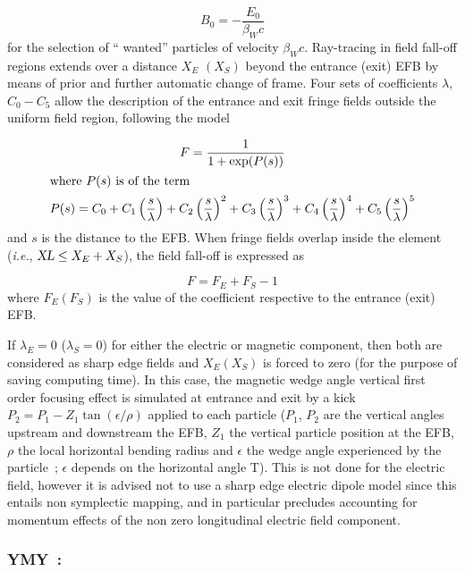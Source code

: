  $$ B_0= - \dfrac{E_0 }{ \beta_ Wc} $$
%
 for the selection of `` wanted''  particles of velocity $\beta_Wc $. Ray-tracing in 
field fall-off regions extends over a distance $ X_E $ $ (X_S) $ beyond the
entrance (exit) EFB by means of prior and further automatic change of frame. Four sets
of coefficients $\lambda$, $ C_0-C_5 $ allow the description of the entrance and exit fringe 
fields outside the uniform field region, following the model~\cite{Biblio12} %

\begin{gather*}
	F = \dfrac{1 }{ 1+ \exp(P(s))} \\
	\intertext{where $  P(s) $ is of the term}
	    P(s) = C_0
	       +C_1 \left(  \dfrac{s }{ \lambda} \right) 
	       +C_2 \left( \dfrac{s }{ \lambda} \right)^2 
	       + C_3 \left( \dfrac{s }{ \lambda} \right)^3 
	       +C_4 \left( \dfrac{s }{ \lambda} \right)^4 
	       + C_5 \left(\dfrac{s }{ \lambda} \right)^5 
\end{gather*}
%
and $ s $ is the distance to the EFB.  When fringe fields overlap
inside the element (\emph{i.e.}, $ \textsl{XL}\leq X_E+X_S$),  the field fall-off is expressed as

$$ F = F_E + F_S -1 $$
%
 where $ F_E(F_S) $ is the value of the coefficient respective to the entrance (exit) EFB. 
 
\noindent If $ \lambda_ E=0 $  ($\lambda_ S=0$)  for either the electric or
magnetic component, then both are considered as sharp edge fields and $ X_E(X_S) $ is forced 
to zero (for the purpose of saving computing time).  In this case, the magnetic wedge angle vertical first order focusing effect is simulated at entrance and exit by a kick $P_2 = P_1 - Z_1 \tan (\epsilon / \rho)$ applied to each particle ($P_1$, $P_2$ are the vertical angles upstream and downstream the EFB, $Z_1$ the vertical particle position at the EFB, $\rho$ the local horizontal bending radius and $\epsilon$ the wedge angle experienced by the particle~; $\epsilon$ depends on the horizontal angle T). This is not done for the electric field, however it is advised not to use a sharp edge electric dipole model since this entails non symplectic mapping, and in particular precludes accounting for momentum effects of the non zero longitudinal electric field component.

\newpage

\subsubsection*{YMY~: \YMYTitl} \label{YMY} 
\medskip 

